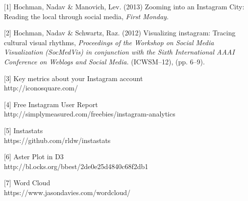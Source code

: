 \documentclass[conference]{acmsiggraph}
\begin{document}
\begin{thebibliography}{10}




  [1] Hochman, Nadav \& Manovich, Lev. (2013) Zooming into an Instagram City: Reading the local through social media,
  \emph{ First Monday.}
  
  [2] Hochman, Nadav \& Schwartz, Raz. (2012) Visualizing instagram: Tracing cultural visual rhythms,
  \emph{Proceedings of the Workshop on Social Media Visualization (SocMedVis) in conjunction with the Sixth International AAAI Conference on Weblogs and Social Media.}
  (ICWSM--12), (pp. 6--9).
  
  [3] Key metrics about your Instagram account\\ http://iconosquare.com/
  
  [4] Free Instagram User Report\\ http://simplymeasured.com/freebies/instagram-analytics
  
  [5] Instastats\\ https://github.com/rldw/instastats

  [6] Aster Plot in D3\\ http://bl.ocks.org/bbest/2de0e25d4840c68f2db1
  
  [7] Word Cloud\\ https://www.jasondavies.com/wordcloud/
    
\end{thebibliography}
\end{document}
